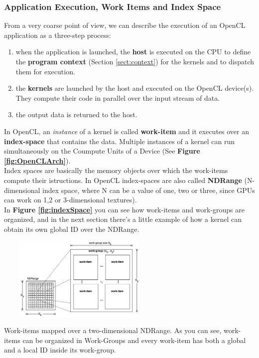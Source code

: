 \subsubsection{Application Execution, Work Items and Index Space}

From a very coarse point of view, we can describe the execution of an OpenCL application as a three-step process:

\begin{enumerate}
	\item when the application is launched, the \textbf{host} is executed on the CPU to define the \textbf{program context} (Section \ref{sect:context}) for the kernels and to dispatch them for execution.
	\item the \textbf{kernels} are launched by the host and executed on the OpenCL device(s). They compute their code in parallel over the input stream of data.
	\item the output data is returned to the host.
\end{enumerate}

In OpenCL, an \emph{instance} of a kernel is called \textbf{work-item} and it executes over an \textbf{index-space} that contains the data. Multiple instances of a kernel can run simultaneously on the Coumpute Units of a Device (See \textbf{Figure \ref{fig:OpenCLArch}}).\\ Index spaces are basically the memory objects over which the work-items compute their istructions. In OpenCL index-spaces are also called \textbf{NDRange} (N-dimensional index space, where N can be a value of one, two or three, since GPUs can work on 1,2 or 3-dimensional textures).\\
In \textbf{Figure \ref{fig:indexSpace}} you can see how work-items and work-groups are organized, and in the next section there's a little example of how a kernel can obtain its own global ID over the NDRange.

\begin{figurehere}
 \centering
 \includegraphics[width=8cm, height=4cm]{./eps/index-space.eps}
 \caption{Work-items mapped over a two-dimensional NDRange. As you can see, work-items can be organized in Work-Groups and every work-item has both a global and a local ID inside its work-group.}
 \label{fig:indexSpace}
\end{figurehere}

